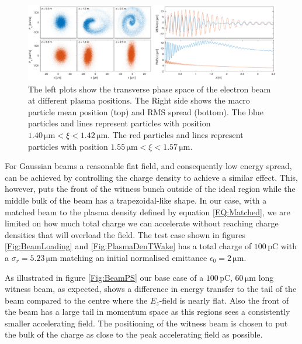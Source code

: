 \documentclass[aps,prstab,reprint,amsmath,amssymb,groupedaddress]{revtex4-1}
\newcommand{\unit}[1]{\,\mathrm{#1}}
\begin{document}
\begin{figure}[hbt]
    \includegraphics[width=\linewidth,trim={0mm 0mm 0mm 0mm},clip]{figures/beamFilamentationAll}
    \caption{\label{Fig:BeamFilament} The left plots show the transverse phase space of the electron beam at different
        plasma positions. The Right side shows the macro particle mean position (top) and RMS spread (bottom). The blue
        particles and lines represent particles with position $1.40\unit{\mu m} < \xi < 1.42\unit{\mu m}$. The red
        particles and lines represent particles with position $1.55\unit{\mu m} < \xi < 1.57\unit{\mu m}$.}
\end{figure}

For Gaussian beams a reasonable flat field, and consequently low energy spread, can be achieved by controlling the
charge density to achieve a similar effect. This, however, puts the front of the witness bunch outside of the ideal
region while the middle bulk of the beam has a trapezoidal-like shape. In our case, with a matched beam to the plasma
density defined by equation \ref{EQ:Matched}, we are limited on how much total charge we can accelerate without reaching
charge densities that will overload the field. The test case shown in figures \ref{Fig:BeamLoading} and
\ref{Fig:PlasmaDenTWake} has a total charge of $100\unit{pC}$ with a $\sigma_{r}=5.23\unit{\mu m}$ matching an initial
normalised emittance $\epsilon_{0} = 2\unit{\mu m}$.

As illustrated in figure \ref{Fig:BeamPS} our base case of a $100\unit{pC}$, $60\unit{\mu m}$ long witness beam, as
expected, shows a difference in energy transfer to the tail of the beam compared to the centre where the $E_{z}$-field
is nearly flat. Also the front of the beam has a large tail in momentum space as this regions sees a consistently
smaller accelerating field. The positioning of the witness beam is chosen to put the bulk of the charge as close to the
peak accelerating field as possible.
\end{document}
